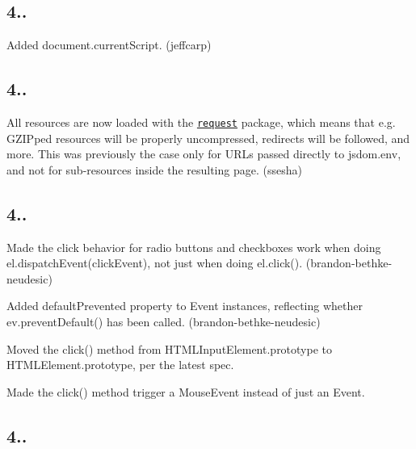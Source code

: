 \subsection*{4..}


\begin{DoxyItemize}
\item Added {\ttfamily document.\+current\+Script}. (jeffcarp)
\end{DoxyItemize}

\subsection*{4..}


\begin{DoxyItemize}
\item All resources are now loaded with the \href{https://www.npmjs.com/package/request}{\tt request} package, which means that e.\+g. G\+Z\+I\+Pped resources will be properly uncompressed, redirects will be followed, and more. This was previously the case only for U\+R\+Ls passed directly to {\ttfamily jsdom.\+env}, and not for sub-\/resources inside the resulting page. (ssesha)
\end{DoxyItemize}

\subsection*{4..}


\begin{DoxyItemize}
\item Made the click behavior for radio buttons and checkboxes work when doing {\ttfamily el.\+dispatch\+Event(click\+Event)}, not just when doing {\ttfamily el.\+click()}. (brandon-\/bethke-\/neudesic)
\item Added {\ttfamily default\+Prevented} property to {\ttfamily Event} instances, reflecting whether {\ttfamily ev.\+prevent\+Default()} has been called. (brandon-\/bethke-\/neudesic)
\item Moved the {\ttfamily click()} method from {\ttfamily H\+T\+M\+L\+Input\+Element.\+prototype} to {\ttfamily H\+T\+M\+L\+Element.\+prototype}, per the latest spec.
\item Made the {\ttfamily click()} method trigger a {\ttfamily Mouse\+Event} instead of just an {\ttfamily Event}.
\end{DoxyItemize}

\subsection*{4..}


